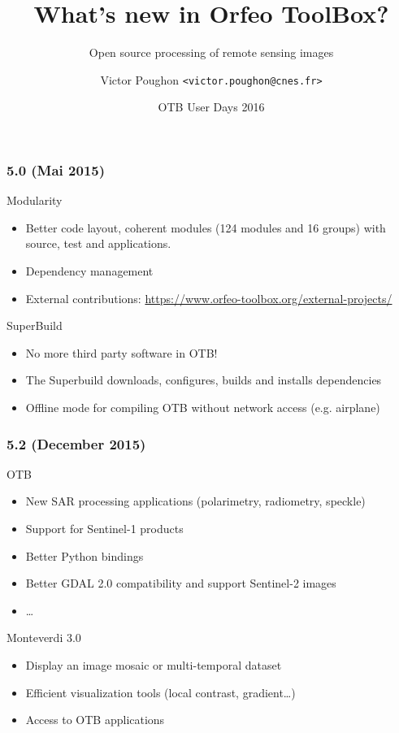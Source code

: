 \documentclass[8pt]{beamer}
\title{What's new in Orfeo ToolBox?}
\subtitle{Open source processing of remote sensing images}
\author{Victor Poughon \texttt{\textless victor.poughon@cnes.fr\textgreater}}
\date{OTB User Days 2016}
\begin{document}
\begin{frame}
\titlepage
\end{frame}

\begin{frame}
\frametitle{5.0 (Mai 2015)}
\begin{block}{Modularity}
\begin{itemize}
  \item Better code layout, coherent modules (124 modules and 16 groups) with
    source, test and applications.
\item Dependency management
\item External contributions: \url{https://www.orfeo-toolbox.org/external-projects/}
\end{itemize}
\end{block}

\begin{block}{SuperBuild}
\begin{itemize}
\item No more third party software in OTB!
\item The Superbuild downloads, configures, builds and installs dependencies
\item Offline mode for compiling OTB without network access (e.g. airplane)
\end{itemize}
\end{block}
\end{frame}

\begin{frame}
\frametitle{5.2 (December 2015)}
\begin{block}{OTB}
\begin{itemize}
\item New SAR processing applications (polarimetry, radiometry, speckle)
\item Support for Sentinel-1 products
\item Better Python bindings
\item Better GDAL 2.0 compatibility and support Sentinel-2 images
\item \ldots
\end{itemize}
\end{block}

\begin{block}{Monteverdi 3.0}
\begin{itemize}
\item Display an image mosaic or multi-temporal dataset
\item Efficient visualization tools (local contrast, gradient\ldots)
\item Access to OTB applications
\end{itemize}
\end{block}
\end{frame}
\end{document}
